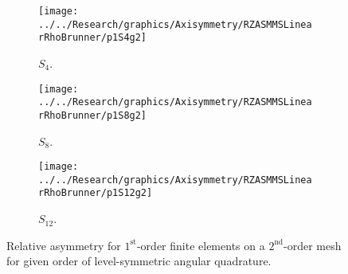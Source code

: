 \documentclass[12pt]{article}
\begin{document}
\begin{sidewaysfigure}[!htb]
\centering
\begin{subfigure}{0.33\textwidth}
\texttt{[image: ../../Research/graphics/Axisymmetry/RZASMMSLinearRhoBrunner/p1S4g2]}
\caption{$S_4$.}
\end{subfigure}%
\begin{subfigure}{0.33\textwidth}
\texttt{[image: ../../Research/graphics/Axisymmetry/RZASMMSLinearRhoBrunner/p1S8g2]}
\caption{$S_8$.}
\end{subfigure}%
\begin{subfigure}{0.33\textwidth}
\texttt{[image: ../../Research/graphics/Axisymmetry/RZASMMSLinearRhoBrunner/p1S12g2]}
\caption{$S_{12}$.}
\end{subfigure}
\caption{Relative asymmetry for $1^\text{st}$-order finite elements on a $2^\text{nd}$-order mesh for given order of level-symmetric angular quadrature.}
\label{fig:RZASMMSLinearRhoBrunnerp1g2}
\end{sidewaysfigure}
\end{document}
